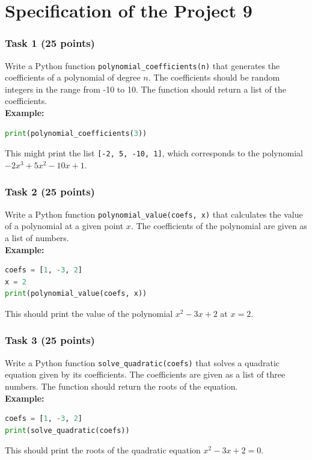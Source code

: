 \documentclass[12pt]{book}
\begin{document}
\section{Specification of the Project 9}

\subsubsection{Task 1 (25 points)}
Write a Python function \texttt{polynomial\_coefficients(n)} that generates the coefficients of a polynomial of degree $n$. The coefficients should be random integers in the range from -10 to 10. The function should return a list of the coefficients. \\
\textbf{Example:}
\begin{lstlisting}[language=Python]
print(polynomial_coefficients(3))
\end{lstlisting}
This might print the list \texttt{[-2, 5, -10, 1]}, which corresponds to the polynomial $-2x^3 + 5x^2 - 10x + 1$.

\subsubsection{Task 2 (25 points)}
Write a Python function \texttt{polynomial\_value(coefs, x)} that calculates the value of a polynomial at a given point $x$. The coefficients of the polynomial are given as a list of numbers. \\
\textbf{Example:}
\begin{lstlisting}[language=Python]
coefs = [1, -3, 2]
x = 2
print(polynomial_value(coefs, x))
\end{lstlisting}
This should print the value of the polynomial $x^2 - 3x + 2$ at $x = 2$.

\subsubsection{Task 3 (25 points)}
Write a Python function \texttt{solve\_quadratic(coefs)} that solves a quadratic equation given by its coefficients. The coefficients are given as a list of three numbers. The function should return the roots of the equation. \\
\textbf{Example:}
\begin{lstlisting}[language=Python]
coefs = [1, -3, 2]
print(solve_quadratic(coefs))
\end{lstlisting}
This should print the roots of the quadratic equation $x^2 - 3x + 2 = 0$.
\end{document}
